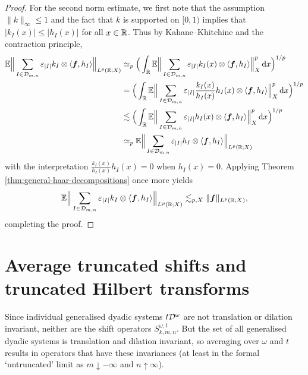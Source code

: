 \begin{proof}
   For the second norm estimate, we first note that the assumption $\|k\|_{\infty} \leq 1$ and the fact that $k$ is supported on $[0,1)$ implies that $|k_{I}(x)| \leq |h_{I}(x)|$ for all $x \in \mathbb{R}$.
   Thus by Kahane--Khitchine and the contraction principle,
   \begin{equation*}
     \begin{aligned}
       \mathbb{E} \Big\| \sum_{I \in \mathcal{D}_{m,n}} \varepsilon_{|I|} k_{I} \otimes \langle \bm{f}, h_{I} \rangle \Big\|_{L^p(\mathbb{R};X)}
       &\simeq_{p} \Big( \int_{\mathbb{R}} \mathbb{E} \Big\| \sum_{I \in \mathcal{D}_{m,n}} \varepsilon_{|I|} k_{I}(x) \otimes \langle \bm{f}, h_{I} \rangle \Big\|_{X}^{p} \, \mathrm{d} x \Big)^{1/p} \\
       &= \Big( \int_{\mathbb{R}} \mathbb{E} \Big\| \sum_{I \in \mathcal{D}_{m,n}} \varepsilon_{|I|} \frac{k_{I}(x)}{h_{I}(x)} h_{I}(x) \otimes \langle \bm{f}, h_{I} \rangle \Big\|_{X}^{p} \, \mathrm{d} x \Big)^{1/p} \\
       &\lesssim \Big( \int_{\mathbb{R}} \mathbb{E} \Big\| \sum_{I \in \mathcal{D}_{m,n}} \varepsilon_{|I|} h_{I}(x) \otimes \langle \bm{f}, h_{I} \rangle \Big\|_{X}^{p} \, \mathrm{d} x \Big)^{1/p} \\
       &\simeq_{p} \mathbb{E} \Big\| \sum_{I \in \mathcal{D}_{m,n}} \varepsilon_{|I|} h_{I} \otimes \langle \bm{f}, h_{I} \rangle \Big\|_{L^p(\mathbb{R};X)}
     \end{aligned}
   \end{equation*}
   with the interpretation $\frac{k_{I}(x)}{h_{I}(x)} h_{I}(x) = 0$ when $h_{I}(x) = 0$.
   Applying Theorem \ref{thm:general-haar-decompositions} once more yields
   \begin{equation*}
     \mathbb{E} \Big\| \sum_{I \in \mathcal{D}_{m,n}} \varepsilon_{|I|} k_{I} \otimes \langle \bm{f}, h_{I} \rangle \Big\|_{L^p(\mathbb{R};X)}
     \lesssim_{p,X} \|\bm{f}\|_{L^p(\mathbb{R};X)},
   \end{equation*}
   completing the proof.
 \end{proof}
 
 \section{Average truncated shifts and truncated Hilbert transforms}

 Since individual generalised dyadic systems $t\mathcal{D}^{\omega}$ are not translation or dilation invariant, neither are the shift operators $S_{k,m,n}^{\omega,t}$.
 But the set of all generalised dyadic systems is translation and dilation invariant, so averaging over $\omega$ and $t$ results in operators that have these invariances (at least in the formal `untruncated' limit as $m \downarrow -\infty$ and $n \uparrow \infty$).
 
